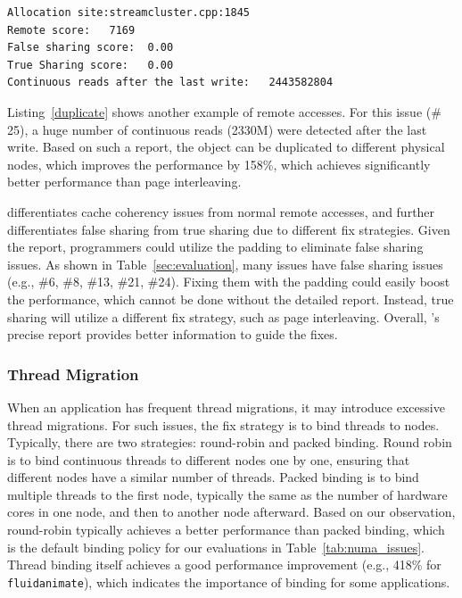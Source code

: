 \begin{lstlisting}[caption={Remote access issue of streamcluster},label={duplicate},captionpos=b]
Allocation site:streamcluster.cpp:1845
Remote score:   7169
False sharing score:  0.00
True Sharing score:   0.00
Continuous reads after the last write:   2443582804
\end{lstlisting}

Listing~\ref{duplicate} shows another example of remote accesses. For this issue (\# 25), a huge number of continuous reads (2330M) were detected after the last write. Based on such a report, the object can be duplicated to different physical nodes, which improves the performance by 158\%, which achieves significantly better performance than page interleaving. 

\NP{} differentiates cache coherency issues from normal remote accesses, and further differentiates false sharing from true sharing due to different fix strategies. Given the report, programmers could utilize the padding to eliminate false sharing issues. As shown in Table~\ref{sec:evaluation}, many issues have false sharing issues (e.g., \#6, \#8, \#13, \#21, \#24). Fixing them with the padding could easily boost the performance, which cannot be done without the detailed report. Instead, true sharing will utilize a different fix strategy, such as page interleaving. Overall, \NP{}'s precise report provides better information to guide the fixes.  


\subsubsection{Thread Migration} 
When an application has frequent thread migrations, it may introduce excessive thread migrations. For such issues, the fix strategy is to bind threads to nodes. Typically, there are two strategies: round-robin and packed binding. Round robin is to bind continuous threads to different nodes one by one,  ensuring that different nodes have a similar number of threads. Packed binding is to bind multiple threads to the first node, typically the same as the number of hardware cores in one node, and then to another node afterward. Based on our observation, round-robin typically achieves a better performance than packed binding, which is the default binding policy for our evaluations in Table~\ref{tab:numa_issues}. Thread binding itself achieves a good performance improvement (e.g., 418\% for \texttt{fluidanimate}), which indicates the importance of binding for some applications. 

